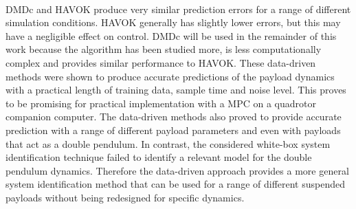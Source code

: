         \paragraph{}
        DMDc and HAVOK produce very similar prediction errors for a range of different simulation conditions.
        HAVOK generally has slightly lower errors, but this may have a negligible effect on control.
        DMDc will be used in the remainder of this work 
        because the algorithm has been studied more, is less computationally complex and provides similar performance to HAVOK.
        These data-driven methods were shown to produce accurate predictions of the payload dynamics 
        with a practical length of training data, sample time and noise level.
        This proves to be promising for practical implementation with a MPC on a quadrotor companion computer.
        The data-driven methods also proved to provide accurate prediction with a range of different payload parameters
        and even with payloads that act as a double pendulum.
        In contrast, the considered white-box system identification technique 
        failed to identify a relevant model for the double pendulum dynamics.
        Therefore the data-driven approach provides a more general system identification method 
        that can be used for a range of different suspended payloads without being redesigned for specific dynamics.



            
